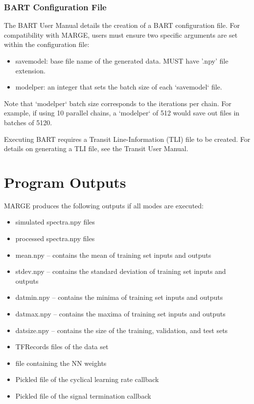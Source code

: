 \documentclass[letterpaper, 12pt]{article}
\begin{document}
\subsubsection{BART Configuration File}
\label{sec:BARTconfig}

The BART User Manual details the creation of a BART configuration file.  For 
compatibility with MARGE, users must ensure two specific arguments are set 
within the configuration file:
\begin{itemize}
\item savemodel: base file name of the generated data. MUST have '.npy' file 
                 extension.
\item modelper: an integer that sets the batch size of each `savemodel` file.
\end{itemize}

\noindent Note that `modelper` batch size corresponds to the iterations per 
chain.  For example, if using 10 parallel chains, a `modelper` of 512 would 
save out files in batches of 5120.

\noindent  Executing BART requires a Transit Line-Information (TLI) file to 
be created.  For details on generating a TLI file, see the Transit User Manual.



\section{Program Outputs}
\label{sec:outputs}

MARGE produces the following outputs if all modes are executed:

\begin{itemize}
\item simulated spectra.npy files
\item processed spectra.npy files
\item mean.npy -- contains the mean of training set inputs and outputs
\item stdev.npy -- contains the standard deviation of training set inputs and 
                   outputs
\item datmin.npy -- contains the minima of training set inputs and outputs
\item datmax.npy -- contains the maxima of training set inputs and outputs
\item datsize.npy -- contains the size of the training, validation, and test 
                     sets
\item TFRecords files of the data set
\item file containing the NN weights
\item Pickled file of the cyclical learning rate callback
\item Pickled file of the signal termination callback
\end{itemize}
\end{document}
